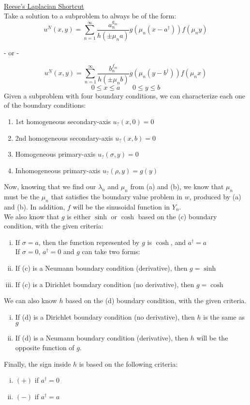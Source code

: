 \documentclass{article}
\begin{document}
\begin{enumerate}
    \underline{Reese's Laplacian Shortcut}
    \medskip\\
    Take a solution to a subproblem to always be of the form:
    \[
        u^N(x,y) = \sum_{n=1}^\infty \frac{a_n^{g_m}}{h(\pm\mu_na)}g(\mu_n(x-a^\dagger))f(\mu_n y)
    \]
    \begin{center}
        - or -
    \end{center}
    \[
        u^N(x,y) = \sum_{n=1}^\infty \frac{b_n^{f_m}}{h(\pm\mu_nb)}g(\mu_n(y-b^\dagger))f(\mu_n x)
    \]
    \[
        0 \leq x \leq a \,\,\,\,\,\,\,\,\,\,\, 0 \leq y \leq b
    \]
    Given a subproblem with four boundary conditions, we can characterize each one of the boundary conditions:
    \begin{enumerate}
        \item 1st homogeneous secondary-axis $u_?(x,0) = 0$
        \item 2nd homogeneous secondary-axis $u_?(x,b) = 0$
        \item Homogeneous primary-axis $u_?(\sigma, y) = 0$
        \item Inhomogeneous primary-axis $u_?(\rho, y) = g(y)$
    \end{enumerate}
    Now, knowing that we find our $\lambda_n$ and $\mu_n$ from (a) and (b), we know that $\mu_n$ must be the $\mu_n$ that satisfies the boundary value problem in $w$, produced by (a) and (b). In addition, $f$ will be the sinusoidal function in $Y_n$.
    \medskip\\
    We also know that $g$ is either $\sinh$ or $\cosh$ based on the (c) boundary condition, with the given criteria:
    \begin{enumerate}[i.]
        \item If $\sigma = a$, then the function represented by $g$ is $\cosh$, and $a^\dagger = a$
        \medskip\\
        If $\sigma = 0$, $a^\dagger = 0$ and $g$ can take two forms:
        \item If (c) is a Neumann boundary condition (derivative), then $g = \sinh$
        \item If (c) is a Dirichlet boundary condition (no derivative), then $g = \cosh$
    \end{enumerate}
    We can also know $h$ based on the (d) boundary condition, with the given criteria.
    \begin{enumerate}[i.]
        \item If (d) is a Dirichlet boundary condition (no derivative), then $h$ is the same as $g$
        \item If (d) is a Neumann boundary condition (derivative), then $h$ will be the opposite function of $g$.
    \end{enumerate}
    Finally, the sign inside $h$ is based on the following criteria:
    \begin{enumerate}[i.]
        \item $(+)$ if $a^\dagger = 0$
        \item $(-)$ if $a^\dagger = a$
    \end{enumerate}
    

\end{enumerate}
\end{document}
